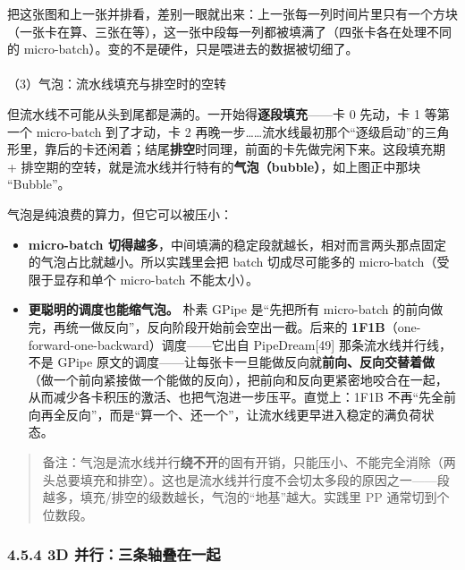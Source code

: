 \documentclass[
  chinese,
]{ctexart}
\makeatletter
\let\oldparagraph\paragraph
\renewcommand{\paragraph}{
    \@ifstar
      \xxxParagraphStar
      \xxxParagraphNoStar
  }
\newcommand{\xxxParagraphStar}[1]{\oldparagraph*{#1}\mbox{}}
\newcommand{\xxxParagraphNoStar}[1]{\oldparagraph{#1}\mbox{}}
\providecommand{\tightlist}{%
  \setlength{\itemsep}{0pt}\setlength{\parskip}{0pt}}
\makeatother
\begin{document}
把这张图和上一张并排看，差别一眼就出来：上一张每一列时间片里只有一个方块（一张卡在算、三张在等），这一张中段每一列都被填满了（四张卡各在处理不同的
micro-batch）。变的不是硬件，只是喂进去的数据被切细了。

\paragraph{（3）气泡：流水线填充与排空时的空转}\label{ux6c14ux6ce1ux6d41ux6c34ux7ebfux586bux5145ux4e0eux6392ux7a7aux65f6ux7684ux7a7aux8f6c}

但流水线不可能从头到尾都是满的。一开始得\textbf{逐段填充}------卡 0
先动，卡 1 等第一个 micro-batch 到了才动，卡 2
再晚一步\ldots\ldots 流水线最初那个``逐级启动''的三角形里，靠后的卡还闲着；结尾\textbf{排空}时同理，前面的卡先做完闲下来。这段填充期
+
排空期的空转，就是流水线并行特有的\textbf{气泡（bubble）}，如上图正中那块
``Bubble''。

气泡是纯浪费的算力，但它可以被压小：

\begin{itemize}
\tightlist
\item
  \textbf{micro-batch
  切得越多}，中间填满的稳定段就越长，相对而言两头那点固定的气泡占比就越小。所以实践里会把
  batch 切成尽可能多的 micro-batch（受限于显存和单个 micro-batch
  不能太小）。
\item
  \textbf{更聪明的调度也能缩气泡。} 朴素 GPipe 是``先把所有 micro-batch
  的前向做完，再统一做反向''，反向阶段开始前会空出一截。后来的
  \textbf{1F1B}（one-forward-one-backward）调度------它出自
  PipeDream{[}49{]} 那条流水线并行线，不是 GPipe
  原文的调度------让每张卡一旦能做反向就\textbf{前向、反向交替着做}（做一个前向紧接做一个能做的反向），把前向和反向更紧密地咬合在一起，从而减少各卡积压的激活、也把气泡进一步压平。直觉上：1F1B
  不再``先全前向再全反向''，而是``算一个、还一个''，让流水线更早进入稳定的满负荷状态。
\end{itemize}

\begin{quote}
备注：气泡是流水线并行\textbf{绕不开}的固有开销，只能压小、不能完全消除（两头总要填充和排空）。这也是流水线并行度不会切太多段的原因之一------段越多，填充/排空的级数越长，气泡的``地基''越大。实践里
PP 通常切到个位数段。
\end{quote}

\subsubsection{4.5.4 3D
并行：三条轴叠在一起}\label{d-ux5e76ux884cux4e09ux6761ux8f74ux53e0ux5728ux4e00ux8d77}
\end{document}
